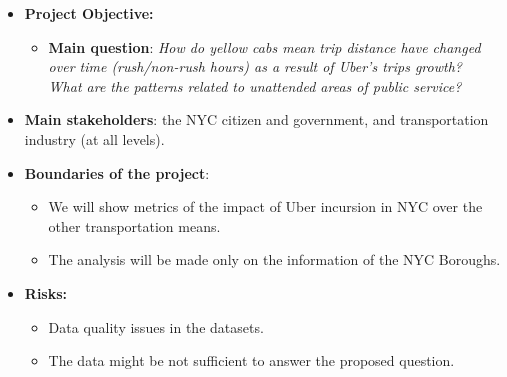 \documentclass[11pt]{article}
\begin{document}
\begin{itemize}

\item \textbf{Project Objective:}
\begin{itemize}
\item \textbf{Main question}: \textit{How do yellow cabs mean trip distance have changed over time (rush/non-rush hours) as a result of Uber's trips growth?} \\ 
\textit{What are the patterns related to unattended areas of public service?} \\ 

\end{itemize}

\item \textbf{Main stakeholders}: the NYC citizen and government, and transportation industry (at all levels).

\item \textbf{Boundaries of the project}:

\begin{itemize}
\item We will show metrics of the impact of Uber incursion in NYC over the other transportation means.
\item The analysis will be made only on the information of the NYC Boroughs.
\end{itemize}

\item \textbf{Risks:} 
\begin{itemize}
\item Data quality issues in the datasets.
\item The data might be not sufficient to answer the proposed question. 
\end{itemize}

\end{itemize}
\end{document}
